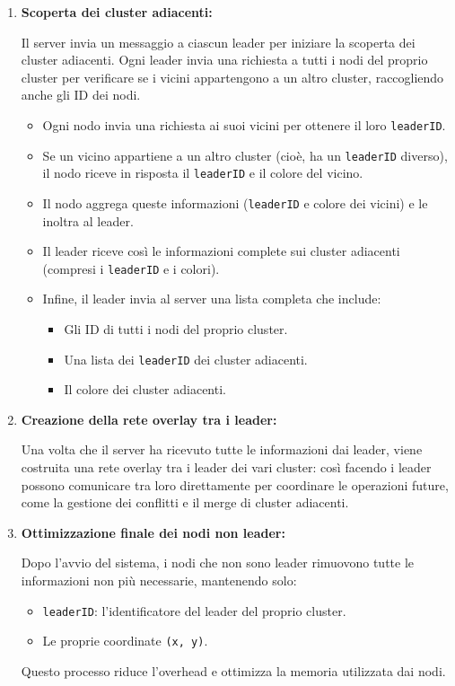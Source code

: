 \documentclass[12pt, a4paper]{report}
\begin{document}
\begin{enumerate}
    \item \textbf{Scoperta dei cluster adiacenti:}

    Il server invia un messaggio a ciascun leader per iniziare la scoperta dei cluster adiacenti. Ogni leader invia una richiesta a tutti i nodi del proprio cluster per verificare se i vicini appartengono a un altro cluster, raccogliendo anche gli ID dei nodi.

    \begin{itemize} 
        \item Ogni nodo invia una richiesta ai suoi vicini per ottenere il loro \texttt{leaderID}.
        \item Se un vicino appartiene a un altro cluster (cio\`e, ha un \texttt{leaderID} diverso), il nodo riceve in risposta il \texttt{leaderID} e il colore del vicino. 
        \item Il nodo aggrega queste informazioni (\texttt{leaderID} e colore dei vicini) e le inoltra al leader. 
        \item Il leader riceve così le informazioni complete sui cluster adiacenti (compresi i \texttt{leaderID} e i colori). 
        \item Infine, il leader invia al server una lista completa che include: 
        \begin{itemize} 
            \item Gli ID di tutti i nodi del proprio cluster. 
            \item Una lista dei \texttt{leaderID} dei cluster adiacenti. 
            \item Il colore dei cluster adiacenti. 
        \end{itemize} 
    \end{itemize}

    \item \textbf{Creazione della rete overlay tra i leader:}

    Una volta che il server ha ricevuto tutte le informazioni dai leader, viene costruita una rete overlay tra i leader dei vari cluster: così facendo i leader possono comunicare tra loro direttamente per coordinare le operazioni future, come la gestione dei conflitti e il merge di cluster adiacenti.

    \item \textbf{Ottimizzazione finale dei nodi non leader:}

    Dopo l'avvio del sistema, i nodi che non sono leader rimuovono tutte le informazioni non pi\`u necessarie, mantenendo solo:
    \begin{itemize}
        \item \texttt{leaderID}: l'identificatore del leader del proprio cluster.
        \item Le proprie coordinate \texttt{(x, y)}.
    \end{itemize}

    Questo processo riduce l'overhead e ottimizza la memoria utilizzata dai nodi.

\end{enumerate}
\end{document}

